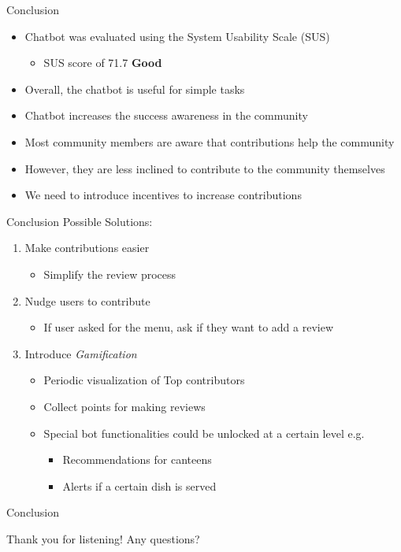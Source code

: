 \begin{frame}{Conclusion}
  \begin{itemize}
    \item Chatbot was evaluated using the System Usability Scale (SUS)
    \begin{itemize}
      \item SUS score of 71.7 \textbf{Good}
    \end{itemize}
    \item Overall, the chatbot is useful for simple tasks
    \item Chatbot increases the success awareness in the community
    \item Most community members are aware that contributions help the community
    \item However, they are less inclined to contribute to the community themselves
    \item We need to introduce incentives to increase contributions
  \end{itemize}
\end{frame}

\begin{frame}{Conclusion}
  Possible Solutions: 
  \begin{enumerate}
    \item Make contributions easier \cite{Niel06}
    \begin{itemize}
      \item Simplify the review process
    \end{itemize}
    \item Nudge users to contribute
   \begin{itemize}
     \item If user asked for the menu, ask if they want to add a review
   \end{itemize} 
   \item Introduce \emph{Gamification}
   \begin{itemize}
     \item Periodic visualization of Top contributors 
     \item Collect points for making reviews
     \item Special bot functionalities could be unlocked at a certain level e.g.
     \begin{itemize}
       \item Recommendations for canteens
       \item Alerts if a certain dish is served
     \end{itemize}
   \end{itemize}
\end{enumerate}
\end{frame}

\begin{frame}{Conclusion}
  \Huge{\centerline{Thank you for listening! Any questions?}}
\end{frame}


